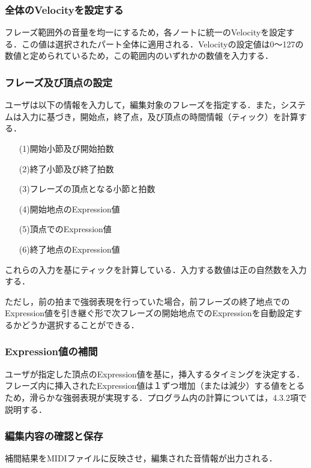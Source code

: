 \subsubsection{全体のVelocityを設定する}
フレーズ範囲外の音量を均一にするため，各ノートに統一のVelocityを設定する．この値は選択されたパート全体に適用される．Velocityの設定値は0～127の数値と定められているため，この範囲内のいずれかの数値を入力する．
\subsubsection{フレーズ及び頂点の設定}
ユーザは以下の情報を入力して，編集対象のフレーズを指定する．また，システムは入力に基づき，開始点，終了点，及び頂点の時間情報（ティック）を計算する．
\begin{enumerate}
	\item[(1)開始小節及び開始拍数]

	\item[(2)終了小節及び終了拍数]

	\item[(3)フレーズの頂点となる小節と拍数]

	\item[(4)開始地点のExpression値]

	\item[(5)頂点でのExpression値]

	\item[(6)終了地点のExpression値]
\end{enumerate}
これらの入力を基にティックを計算している．入力する数値は正の自然数を入力する．

ただし，前の拍まで強弱表現を行っていた場合，前フレーズの終了地点でのExpression値を引き継ぐ形で次フレーズの開始地点でのExpressionを自動設定するかどうか選択することができる．
\subsubsection{Expression値の補間}
ユーザが指定した頂点のExpression値を基に，挿入するタイミングを決定する．フレーズ内に挿入されたExpression値は１ずつ増加（または減少）する値をとるため，滑らかな強弱表現が実現する．プログラム内の計算については，4.3.2項で説明する．
\subsubsection{編集内容の確認と保存}
補間結果をMIDIファイルに反映させ，編集された音情報が出力される．
